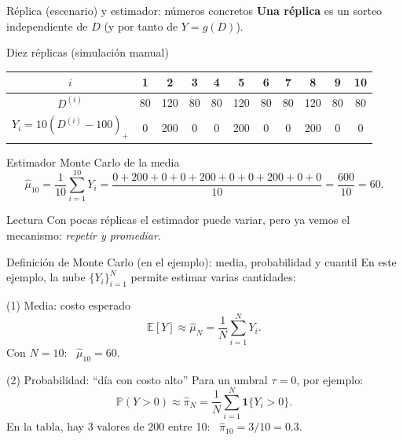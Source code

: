 \documentclass[aspectratio=1610, 9pt]{beamer}
\begin{document}
\begin{frame}{Réplica (escenario) y estimador: números concretos}
\textbf{Una réplica} es un sorteo independiente de $D$ (y por tanto de $Y=g(D)$).

\medskip
\begin{block}{Diez réplicas (simulación manual)}
\small
\begin{center}
\begin{tabular}{@{}ccccccccccc@{}}
\toprule
$i$ & 1 & 2 & 3 & 4 & 5 & 6 & 7 & 8 & 9 & 10\\
\midrule
$D^{(i)}$ & 80 & 120 & 80 & 80 & 120 & 80 & 80 & 120 & 80 & 80\\
$Y_i=10(D^{(i)}-100)_+$ & 0 & 200 & 0 & 0 & 200 & 0 & 0 & 200 & 0 & 0\\
\bottomrule
\end{tabular}
\end{center}
\end{block}

\begin{block}{Estimador Monte Carlo de la media}
\[
\widehat\mu_{10}=\frac{1}{10}\sum_{i=1}^{10}Y_i=\frac{0+200+0+0+200+0+0+200+0+0}{10}=\frac{600}{10}=60.
\]
\end{block}

\begin{alertblock}{Lectura}
Con pocas réplicas el estimador puede variar, pero ya vemos el mecanismo: \emph{repetir y promediar}.
\end{alertblock}
\end{frame}

\begin{frame}{Definición de Monte Carlo (en el ejemplo): media, probabilidad y cuantil}
En este ejemplo, la nube $\{Y_i\}_{i=1}^{N}$ permite estimar varias cantidades:

\begin{block}{(1) Media: costo esperado}
\[
\mathbb E[Y]\approx \widehat\mu_N=\frac{1}{N}\sum_{i=1}^N Y_i.
\]
Con $N=10$: \ $\widehat\mu_{10}=60$.
\end{block}

\begin{block}{(2) Probabilidad: ``día con costo alto''}
Para un umbral $\tau=0$, por ejemplo:
\[
\mathbb P(Y>0)\approx \widehat\pi_N=\frac{1}{N}\sum_{i=1}^N \mathbf 1\{Y_i>0\}.
\]
En la tabla, hay 3 valores de 200 entre 10: \ $\widehat\pi_{10}=3/10=0.3$.
\end{block}
\end{frame}
\end{document}
